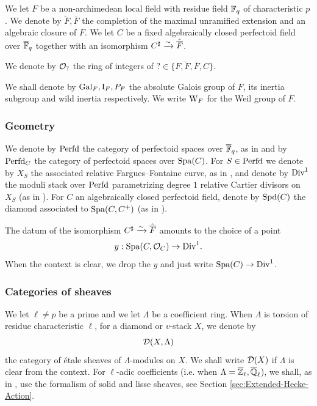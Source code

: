 We let $F$ be a non-archimedean local field with residue field $\mathbb{F}_q$ of characteristic $p$. We denote by $\breve{F}, \overline{F}$ the completion of the maximal unramified extension and an algebraic closure of $F$. We let $C$ be a fixed algebraically closed perfectoid field over $\overline{\mathbb{F}}_q$ together with an isomorphism $C^{\sharp} \xrightarrow{\sim} \hat{\overline{F}}$. 

We denote by $\mathcal{O}_?$ the ring of integers of $? \in \{F, \breve{F}, \overline{F}, C\}$.

We shall denote by $\mathrm{Gal}_F, \mathrm{I}_F, P_F$ the absolute Galois group of $F$, its inertia subgroup and wild inertia respectively. We write $\mathrm{W}_F$ for the Weil group of $F$. 

\subsubsection{Geometry}

We denote by $\mathrm{Perfd}$ the category of perfectoid spaces over $\overline{\mathbb{F}}_q$, as in \cite[\S 7.1]{SW20} and by $\mathrm{Perfd}_C$ the category of perfectoid spaces over $\mathrm{Spa}(C)$. For $S \in \mathrm{Perfd}$ we denote by $X_{S}$ the associated relative Fargues--Fontaine curve, as in \cite[Definition II.1.15]{Geometrization}, and denote by $\mathrm{Div}^{1}$ the moduli stack over $\mathrm{Perfd}$ parametrizing degree $1$ relative Cartier divisors on $X_{S}$ (as in \cite[Definition II.1.19]{Geometrization}). For $C$ an algebraically closed perfectoid field, denote by $\mathrm{Spd}(C)$ the diamond associated to $\mathrm{Spa}(C,C^{+})$ (as in \cite[\S 8.3]{SW20}).

The datum of the isomorphism $C^{\sharp} \xrightarrow{\sim} \hat{\overline{F}}$ amounts to the choice of a point 
$$y : \mathrm{Spa}(C,\mathcal{O}_C) \to \mathrm{Div}^1.$$
When the context is clear, we drop the $y$ and just write $\mathrm{Spa}(C) \to \mathrm{Div}^1$.


\subsubsection{Categories of sheaves}

We let $\ell \neq p$ be a prime and we let $\Lambda$ be a coefficient ring. When $\Lambda$ is torsion of residue characteristic $\ell$, for a diamond or $v$-stack $X$, we denote by 
$$\mathcal{D}(X, \Lambda)$$ 
the category of étale sheaves of $\Lambda$-modules on $X$. We shall write $\mathcal{D}(X)$ if $\Lambda$ is clear from the context. For $\ell$-adic coefficients (i.e. when $\Lambda = \overline{\mathbb{Z}}_{\ell}, \overline{\mathbb{Q}}_{\ell}$), we shall, as in \cite{Geometrization}, use the formalism of solid and lisse sheaves, see Section \ref{sec:Extended-Hecke-Action}. 

